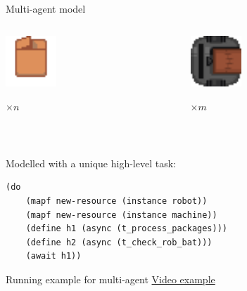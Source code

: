 \begin{frame}[fragile]{Multi-agent model}
    \begin{columns}
        \begin{column}{0.5\textwidth}
            \centering
            \includegraphics[width = 0.3\textwidth]{images/godot/package.png}
            
            \Large $\times n$
        \end{column}
        \begin{column}{0.5\textwidth}
            \centering
            \includegraphics[width = 0.3\textwidth]{images/godot/robot_texture.png}
            
            \LARGE $\times m$
        \end{column}
    \end{columns}

~~

        Modelled with a unique high-level task:
        \setlength{\leftmargini}{0pt}

        \tiny
    \begin{lstlisting}
(do
    (mapf new-resource (instance robot))
    (mapf new-resource (instance machine))
    (define h1 (async (t_process_packages)))
    (define h2 (async (t_check_rob_bat)))
    (await h1))
    \end{lstlisting}    
\end{frame}

\begin{frame}{Running example for multi-agent}
    \centering
    \LARGE
    \href{https://youtu.be/KqBnKKIjug4}{Video example}
\end{frame}


